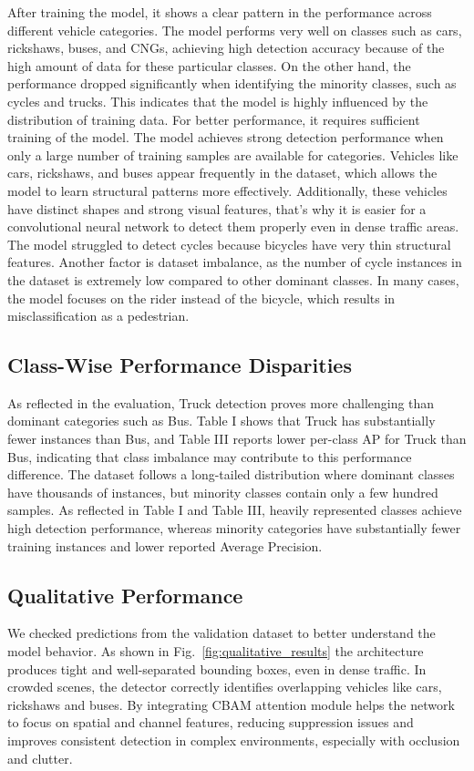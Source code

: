 \documentclass[conference]{IEEEtran}
\begin{document}
After training the model, it shows a clear pattern in the performance across different vehicle categories. The model performs very well on classes such as cars, rickshaws, buses, and CNGs, achieving high detection accuracy because of the high amount of data for these particular classes. On the other hand, the performance dropped significantly when identifying the minority classes, such as cycles and trucks. This indicates that the model is highly influenced by the distribution of training data. For better performance, it requires sufficient training of the model. The model achieves strong detection performance when only a large number of training samples are available for categories. Vehicles like cars, rickshaws, and buses appear frequently in the dataset, which allows the model to learn structural patterns more effectively. Additionally, these vehicles have distinct shapes and strong visual features, that's why it is easier for a convolutional neural network to detect them properly even in dense traffic areas. The model struggled to detect cycles because bicycles have very thin structural features. Another factor is dataset imbalance, as the number of cycle instances in the dataset is extremely low compared to other dominant classes. In many cases, the model focuses on the rider instead of the bicycle, which results in misclassification as a pedestrian.

\subsection{Class-Wise Performance Disparities}
As reflected in the evaluation, Truck detection proves more challenging than dominant categories such as Bus. Table I shows that Truck has substantially fewer instances than Bus, and Table III reports lower per-class AP for Truck than Bus, indicating that class imbalance may contribute to this performance difference. The dataset follows a long-tailed distribution where dominant classes have thousands of instances, but minority classes contain only a few hundred samples. As reflected in Table I and Table III, heavily represented classes achieve high detection performance, whereas minority categories have substantially fewer training instances and lower reported Average Precision.

\subsection{Qualitative Performance}

We checked predictions from the validation dataset to better understand the model behavior. As shown in Fig.~\ref{fig:qualitative_results} the architecture produces tight and well-separated bounding boxes, even in dense traffic. In crowded scenes, the detector correctly identifies overlapping vehicles like cars, rickshaws and buses. By integrating CBAM attention module helps the network to focus on spatial and channel features, reducing suppression issues and improves consistent detection in complex environments, especially with occlusion and clutter.
\end{document}
